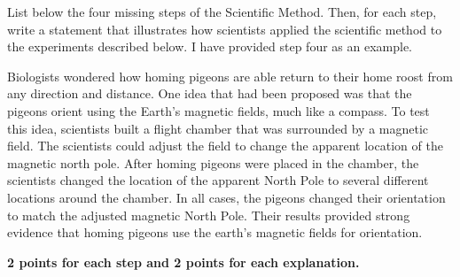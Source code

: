 \showpoints
\question[16]
List below the four missing steps of the Scientific Method. Then,
for each step, write a statement that illustrates how scientists applied
the scientific method to the experiments described below. I have
provided step four as an example. 

Biologists wondered how homing pigeons are able return to their home
roost from any direction and distance. One idea that had been proposed 
was that the pigeons orient using the Earth's magnetic fields, much like 
a compass. To test this idea, scientists built a flight chamber that was 
surrounded by a magnetic field. The scientists could adjust the field to 
change the apparent location of the magnetic north pole. After homing 
pigeons were placed in the chamber, the scientists
changed the location of the apparent North Pole to several different
locations around the chamber. In all cases, the pigeons changed their
 orientation to match the adjusted magnetic North Pole. Their
results provided strong evidence that homing pigeons use the earth's
magnetic fields for orientation. 


	\ifprintanswers\textbf{2 points for each step and 2 points for each explanation.}\fi
\hidepoints